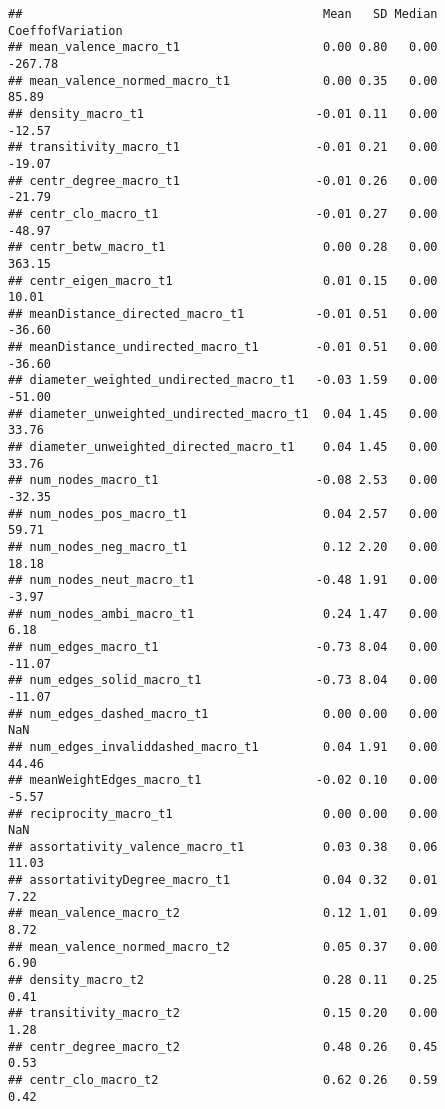 \documentclass[
]{article}
\begin{document}
\begin{verbatim}
##                                          Mean   SD Median CoeffofVariation
## mean_valence_macro_t1                    0.00 0.80   0.00          -267.78
## mean_valence_normed_macro_t1             0.00 0.35   0.00            85.89
## density_macro_t1                        -0.01 0.11   0.00           -12.57
## transitivity_macro_t1                   -0.01 0.21   0.00           -19.07
## centr_degree_macro_t1                   -0.01 0.26   0.00           -21.79
## centr_clo_macro_t1                      -0.01 0.27   0.00           -48.97
## centr_betw_macro_t1                      0.00 0.28   0.00           363.15
## centr_eigen_macro_t1                     0.01 0.15   0.00            10.01
## meanDistance_directed_macro_t1          -0.01 0.51   0.00           -36.60
## meanDistance_undirected_macro_t1        -0.01 0.51   0.00           -36.60
## diameter_weighted_undirected_macro_t1   -0.03 1.59   0.00           -51.00
## diameter_unweighted_undirected_macro_t1  0.04 1.45   0.00            33.76
## diameter_unweighted_directed_macro_t1    0.04 1.45   0.00            33.76
## num_nodes_macro_t1                      -0.08 2.53   0.00           -32.35
## num_nodes_pos_macro_t1                   0.04 2.57   0.00            59.71
## num_nodes_neg_macro_t1                   0.12 2.20   0.00            18.18
## num_nodes_neut_macro_t1                 -0.48 1.91   0.00            -3.97
## num_nodes_ambi_macro_t1                  0.24 1.47   0.00             6.18
## num_edges_macro_t1                      -0.73 8.04   0.00           -11.07
## num_edges_solid_macro_t1                -0.73 8.04   0.00           -11.07
## num_edges_dashed_macro_t1                0.00 0.00   0.00              NaN
## num_edges_invaliddashed_macro_t1         0.04 1.91   0.00            44.46
## meanWeightEdges_macro_t1                -0.02 0.10   0.00            -5.57
## reciprocity_macro_t1                     0.00 0.00   0.00              NaN
## assortativity_valence_macro_t1           0.03 0.38   0.06            11.03
## assortativityDegree_macro_t1             0.04 0.32   0.01             7.22
## mean_valence_macro_t2                    0.12 1.01   0.09             8.72
## mean_valence_normed_macro_t2             0.05 0.37   0.00             6.90
## density_macro_t2                         0.28 0.11   0.25             0.41
## transitivity_macro_t2                    0.15 0.20   0.00             1.28
## centr_degree_macro_t2                    0.48 0.26   0.45             0.53
## centr_clo_macro_t2                       0.62 0.26   0.59             0.42

\end{verbatim}
\end{document}
